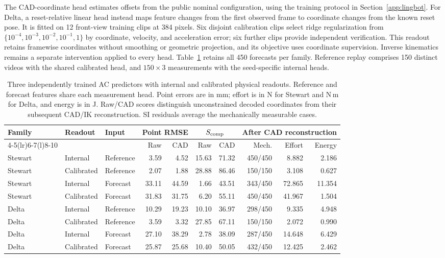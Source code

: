 The CAD-coordinate head estimates offsets from the public nominal configuration, using the training protocol in Section~\ref{app:lingbot}. For Delta, a reset-relative linear head instead maps feature changes from the first observed frame to coordinate changes from the known reset pose. It is fitted on 12 front-view training clips at 384 pixels. Six disjoint calibration clips select ridge regularization from $\{10^{-4},10^{-3},10^{-2},10^{-1},1\}$ by coordinate, velocity, and acceleration error; six further clips provide independent verification. This readout retains framewise coordinates without smoothing or geometric projection, and its objective uses coordinate supervision. Inverse kinematics remains a separate intervention applied to every head. Table~\ref{app:ac-readout-table} retains all 450 forecasts per family. Reference replay comprises 150 distinct videos with the shared calibrated head, and $150\times3$ measurements with the seed-specific internal heads.

\begin{table}[t]
\caption{Three independently trained AC predictors with internal and calibrated physical readouts. Reference and forecast features share each measurement head. Point errors are in mm; effort is in N for Stewart and N\,m for Delta, and energy is in J. Raw/CAD scores distinguish unconstrained decoded coordinates from their subsequent CAD/IK reconstruction. SI residuals average the mechanically measurable cases.}
\label{app:ac-readout-table}
\centering\small
\setlength{\tabcolsep}{4pt}
\begin{tabular}{lllrrrrrrr}
\toprule
Family & Readout & Input & \multicolumn{2}{c}{Point RMSE} & \multicolumn{2}{c}{$S_{\rm comp}$} & \multicolumn{3}{c}{After CAD reconstruction}\\
\cmidrule(lr){4-5}\cmidrule(lr){6-7}\cmidrule(l){8-10}
& & & Raw & CAD & Raw & CAD & Mech. & Effort & Energy\\
\midrule
Stewart & Internal & Reference & 3.59 & 4.52 & 15.63 & 71.32 & 450/450 & 8.882 & 2.186 \\
Stewart & Calibrated & Reference & 2.07 & 1.88 & 28.88 & 86.46 & 150/150 & 3.108 & 0.627 \\
Stewart & Internal & Forecast & 33.11 & 44.59 & 1.66 & 43.51 & 343/450 & 72.865 & 11.354 \\
Stewart & Calibrated & Forecast & 31.83 & 31.75 & 6.20 & 55.11 & 450/450 & 41.967 & 1.504 \\
Delta & Internal & Reference & 10.29 & 19.23 & 10.10 & 36.97 & 298/450 & 9.335 & 4.948 \\
Delta & Calibrated & Reference & 3.59 & 3.32 & 27.85 & 67.11 & 150/150 & 2.072 & 0.990 \\
Delta & Internal & Forecast & 27.10 & 38.29 & 2.78 & 38.09 & 287/450 & 14.648 & 6.429 \\
Delta & Calibrated & Forecast & 25.87 & 25.68 & 10.40 & 50.05 & 432/450 & 12.425 & 2.462 \\
\bottomrule
\end{tabular}
\end{table}

